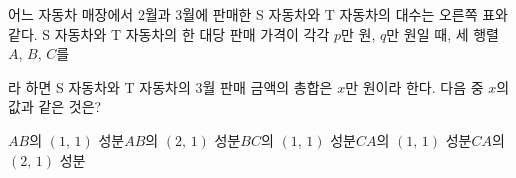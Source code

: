 \hspace*{2mm}\begin{minipage}[t]{\dimexpr\linewidth-2mm\relax}\vspace{0pt}
\noindent\begin{minipage}[t]{0.58\linewidth}\vspace{0pt}\raggedright 어느 자동차 매장에서 $2$월과 $3$월에 판매한 S 자동차와 T 자동차의 대수는 오른쪽 표와 같다. S 자동차와 T 자동차의 한 대당 판매 가격이 각각 $p$만 원, $q$만 원일 때, 세 행렬 $A$, $B$, $C$를 \par\smallskip\end{minipage}\hfill\begin{minipage}[t]{0.4\linewidth}\vspace{0pt}\centering \resizebox{\ifdim\width>\linewidth\linewidth\else\width\fi}{!}{}\end{minipage}\par
\noindent {}\par\smallskip\noindent 라 하면 S 자동차와 T 자동차의 $3$월 판매 금액의 총합은 $x$만 원이라 한다. 다음 중 $x$의 값과 같은 것은?
\begin{choicesii}{$AB$의 $(1,\,1)$ 성분}{$AB$의 $(2,\,1)$ 성분}{$BC$의 $(1,\,1)$ 성분}{$CA$의 $(1,\,1)$ 성분}{$CA$의 $(2,\,1)$ 성분}\end{choicesii}\end{minipage}
